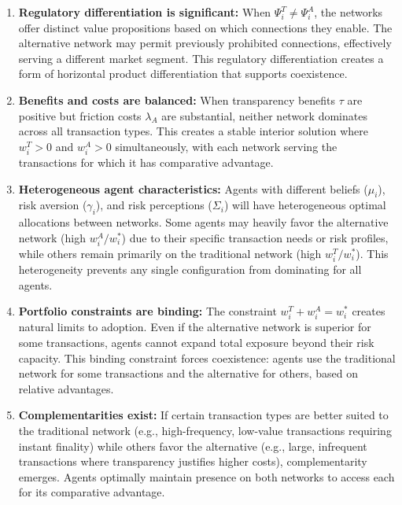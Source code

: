 \begin{enumerate}
    \item \textbf{Regulatory differentiation is significant:} When $\Psi_i^T \neq \Psi_i^A$, the networks offer distinct value propositions based on which connections they enable. The alternative network may permit previously prohibited connections, effectively serving a different market segment. This regulatory differentiation creates a form of horizontal product differentiation that supports coexistence.
    
    \item \textbf{Benefits and costs are balanced:} When transparency benefits $\tau$ are positive but friction costs $\lambda_A$ are substantial, neither network dominates across all transaction types. This creates a stable interior solution where $w_i^T > 0$ and $w_i^A > 0$ simultaneously, with each network serving the transactions for which it has comparative advantage.
    
    \item \textbf{Heterogeneous agent characteristics:} Agents with different beliefs ($\mu_i$), risk aversion ($\gamma_i$), and risk perceptions ($\Sigma_i$) will have heterogeneous optimal allocations between networks. Some agents may heavily favor the alternative network (high $w_i^A / w_i^*$) due to their specific transaction needs or risk profiles, while others remain primarily on the traditional network (high $w_i^T / w_i^*$). This heterogeneity prevents any single configuration from dominating for all agents.
    
    \item \textbf{Portfolio constraints are binding:} The constraint $w_i^T + w_i^A = w_i^*$ creates natural limits to adoption. Even if the alternative network is superior for some transactions, agents cannot expand total exposure beyond their risk capacity. This binding constraint forces coexistence: agents use the traditional network for some transactions and the alternative for others, based on relative advantages.
    
    \item \textbf{Complementarities exist:} If certain transaction types are better suited to the traditional network (e.g., high-frequency, low-value transactions requiring instant finality) while others favor the alternative (e.g., large, infrequent transactions where transparency justifies higher costs), complementarity emerges. Agents optimally maintain presence on both networks to access each for its comparative advantage.
\end{enumerate}

